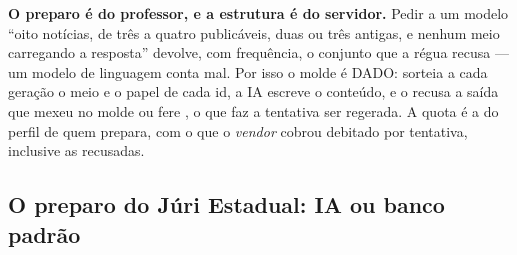 \begin{nota}
\textbf{O preparo é do professor, e a estrutura é do servidor.} Pedir a um
modelo \enquote{oito notícias, de três a quatro publicáveis, duas ou três
antigas, e nenhum meio carregando a resposta} devolve, com frequência, o conjunto
que a régua recusa --- um modelo de linguagem conta mal. Por isso o molde é
DADO:  sorteia a cada geração o meio e o papel de cada id, a IA
escreve o conteúdo, e o  recusa a saída que mexeu no molde ou fere
, o que faz a tentativa ser regerada. A quota é a do perfil
de quem prepara, com o que o \emph{vendor} cobrou debitado por tentativa,
inclusive as recusadas.
\end{nota}

\subsection{O preparo do Júri Estadual: IA ou banco padrão}

